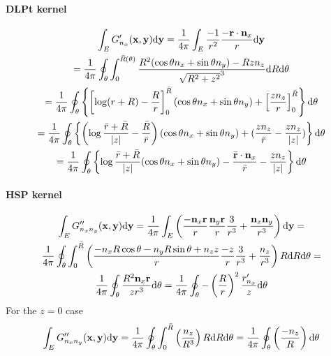 \paragraph{DLPt kernel}

\begin{multline}
	\int_E G'_{n_x}({\bf x}, {\bf y}) \mathrm{d} {\bf y}
	= \frac{1}{4\pi} \int_{E} \frac{-1}{r^2} \frac{-{\bf r} \cdot {\bf n}_x }{r} \mathrm{d} {\bf y} \\
	= \frac{1}{4\pi} \oint_{\theta} \int_{0}^{\bar{R}(\theta)} \frac{R^2 (\cos\theta n_x + \sin\theta n_y) - R z n_z }{\sqrt{R^2 + z^2}^3}
	\mathrm{d} R \mathrm{d} \theta
	\\
	= \frac{1}{4\pi} \oint_{\theta} \left\{
	\left[ \log (r + R) - \frac{R}{r}\right]_{0}^{\bar{R}} (\cos\theta n_x + \sin\theta n_y)
	+ \left[ \frac{z n_z}{r} \right]_{0}^{\bar{R}}
	\right\} \mathrm{d} \theta
	\\
	= \frac{1}{4\pi} \oint_{\theta} \left\{
	\left(\log \frac{\bar{r} + \bar{R}}{|z|} - \frac{\bar{R}}{\bar{r}} \right) (\cos\theta n_x + \sin\theta n_y)
	+ (\frac{z n_z}{\bar{r}} - \frac{z n_z}{|z|})
	\right\} \mathrm{d} \theta
	\\
	= \frac{1}{4\pi} \oint_{\theta} \left\{
	\log \frac{\bar{r} + \bar{R}}{|z|}(\cos\theta n_x + \sin\theta n_y) - \frac{\bar{\bf r} \cdot {\bf n}_x}{\bar{r}} 
	- \frac{z n_z}{|z|}
	\right\} \mathrm{d} \theta
\end{multline}

\paragraph{HSP kernel}

\begin{multline}
	\int_E
		G''_{n_x n_y}({\bf x}, {\bf y})
	\mathrm{d} {\bf y}
	=
	\frac{1}{4\pi}
	\int_E 
	\left(
		\frac{-{\bf n}_x {\bf r}}{r} \frac{{\bf n}_y {\bf r}}{r} \frac{3}{r^3}
		+
		\frac{{\bf n}_x {\bf n}_y}{r^3}
	\right) \mathrm{d}{\bf y}
	= \\
	\frac{1}{4\pi}
	\oint_\theta \int_0^{\bar{R}} 
	\left(
		\frac{-n_x R \cos\theta - n_y R \sin\theta + n_z z}{r} \frac{-z}{r} \frac{3}{r^3}
		+
		\frac{n_z}{r^3}
	\right) R \mathrm{d} R \mathrm{d}\theta
	= \\
	\frac{1}{4\pi}
	\oint_\theta
		\frac{R^2 {\bf n}_x {\bf r}}{z r^3}
	\mathrm{d}\theta
	=
	\frac{1}{4\pi}
	\oint_\theta
		-\left(\frac{R}{r}\right)^2 \frac{r'_{n_x}}{z}
	\mathrm{d}\theta
\end{multline}
%
For the $z=0$ case
%
\begin{equation}
	\int_E
		G''_{n_x n_y}({\bf x}, {\bf y})
	\mathrm{d} {\bf y}
	=
	\frac{1}{4\pi}
	\oint_\theta \int_0^{\bar{R}} 
	\left(
		\frac{n_z}{R^3}
	\right) R \mathrm{d} R \mathrm{d}\theta
	= 
	\frac{1}{4\pi}
	\oint_\theta
	\left(
		\frac{-n_z}{R}
	\right)
	\mathrm{d}\theta
\end{equation}



